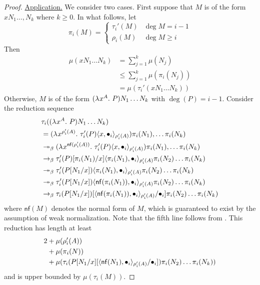\documentclass{article}
\begin{document}
\begin{proof}
\noindent\underline{Application.}
We consider two cases.
First suppose that $M$ is of the form $xN_1 \dots, N_k$ where $k \geq 0$.
In what follows, let
\[
    \pi_i(M) =
    \begin{cases}
        \tau_i'(M) & \deg M = i - 1 \\
        \rho_i(M) & \deg M \geq i
    \end{cases}
\]
Then
\begin{align*}
    \mu(xN_1\dots N_k) &=
    \sum_{j = 1}^k \mu(N_j) \\ &\leq
    \sum_{j = 1}^k \mu(\pi_i(N_j)) \\ &= 
    \mu(\tau_i'(xN_1 \dots N_k))
\end{align*}
Otherwise, $M$ is of the form $(\lambdaT x A P) N_1 \dots N_k$ with $\deg(P) = i - 1$.
Consider the reduction sequence
\begin{align*}
& \tau_i((\lambdaT x A P)N_1 \dots N_k) \\ &=
(\lambdaT x {\rho_i'(A)} \tau_i'(P)\pair[\rho_i'(A)] x {\bullet_i}) \pi_i(N_1), \dots \pi_i(N_k) \\ &\multistepbeta
(\lambdaT x {\mathsf{nf}(\rho_i'(A))} \tau_i'(P)\pair[\rho_i'(A)] x {\bullet_i}) \pi_i(N_1), \dots \pi_i(N_k) \\ &\onestepbeta
\sub {\tau_i'(P)} {\pi_i(N_1)} x \pair[\rho_i'(A)] {\pi_i(N_1)} {\bullet_i} \pi_i(N_2) \dots \pi_i(N_k) \\ &\multistepbeta
\tau_i'(\sub P {N_1} x) \pair[\rho_i'(A)] {\pi_i(N_1)} {\bullet_i} \pi_i(N_2) \dots \pi_i(N_k) \\ &\multistepbeta
\tau_i'(\sub P {N_1} x) \pair[\rho_i'(A)] {\mathsf{nf}(\pi_i(N_1))} {\bullet_i} \pi_i(N_2) \dots \pi_i(N_k) \\ &\onestepbeta
\sub{\tau_i(\sub P {N_1} x)}{\pair[\rho_i'(A)] {\mathsf{nf}(\pi_i(N_1))} {\bullet_i}}{\bullet_i} \pi_i(N_2) \dots \pi_i(N_k)
\end{align*}
where $\mathsf{nf}(M)$ denotes the normal form of $M$, which is guaranteed to exist by the assumption of weak normalization.
Note that the fifth line follows from .
This reduction has length at least
\begin{align*}
    2 &+
    \mu(\rho_i'(A)) \\ &+
    \mu(\pi_i(N)) \\ &+
    \mu(\sub{\tau_i(\sub P {N_1} x} {\pair[\rho_i'(A)] {\mathsf{nf}(N_1)} {\bullet_i}} {\bullet_i}) \pi_i(N_2) \dots \pi_i(N_k))
\end{align*}
and is upper bounded by $\mu(\tau_i(M))$.

\end{proof}
\end{document}
